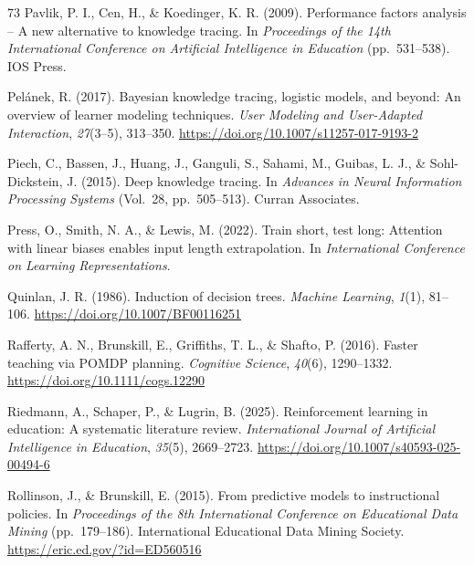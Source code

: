 \documentclass[a4paper,preprint,12pt,authoryear]{elsarticle}
\begin{document}
\begin{thebibliography}{73}
Pavlik, P. I., Cen, H., \& Koedinger, K. R. (2009). Performance factors analysis -- A new alternative to knowledge tracing. In \textit{Proceedings of the 14th International Conference on Artificial Intelligence in Education} (pp.~531--538). IOS Press.

Pel{\'a}nek, R. (2017). Bayesian knowledge tracing, logistic models, and beyond: An overview of learner modeling techniques. \textit{User Modeling and User-Adapted Interaction}, \textit{27}(3--5), 313--350. \url{https://doi.org/10.1007/s11257-017-9193-2}

Piech, C., Bassen, J., Huang, J., Ganguli, S., Sahami, M., Guibas, L. J., \& Sohl-Dickstein, J. (2015). Deep knowledge tracing. In \textit{Advances in Neural Information Processing Systems} (Vol.~28, pp.~505--513). Curran Associates.

Press, O., Smith, N. A., \& Lewis, M. (2022). Train short, test long: Attention with linear biases enables input length extrapolation. In \textit{International Conference on Learning Representations}.

Quinlan, J. R. (1986). Induction of decision trees. \textit{Machine Learning}, \textit{1}(1), 81--106. \url{https://doi.org/10.1007/BF00116251}

Rafferty, A. N., Brunskill, E., Griffiths, T. L., \& Shafto, P. (2016). Faster teaching via POMDP planning. \textit{Cognitive Science}, \textit{40}(6), 1290--1332. \url{https://doi.org/10.1111/cogs.12290}

Riedmann, A., Schaper, P., \& Lugrin, B. (2025). Reinforcement learning in education: A systematic literature review. \textit{International Journal of Artificial Intelligence in Education}, \textit{35}(5), 2669--2723. \url{https://doi.org/10.1007/s40593-025-00494-6}

Rollinson, J., \& Brunskill, E. (2015). From predictive models to instructional policies. In \textit{Proceedings of the 8th International Conference on Educational Data Mining} (pp.~179--186). International Educational Data Mining Society. \url{https://eric.ed.gov/?id=ED560516}


\end{thebibliography}
\end{document}
